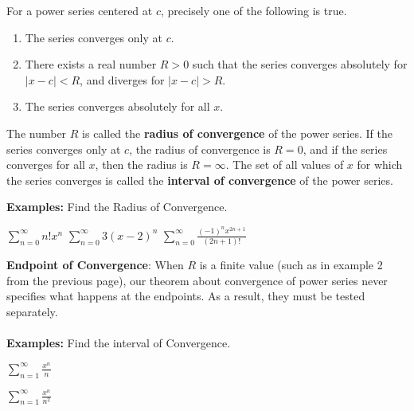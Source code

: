 \documentclass[addpoints, 12pt]{exam}
\begin{document}
\begin{tcolorbox}[title= CONVERGENCE OF A POWER SERIES,colframe=black,sharp corners,colback=white,colbacktitle=white,coltitle=black]

    For a power series centered at $c$, precisely one of the following is true.
    
    \begin{enumerate}
        \item The series converges only at $c$.
        \item There exists a real number $R>0$ such that the series converges absolutely for $|x-c|<R$, and diverges for $|x-c|>R$.
        \item The series converges absolutely for all $x$.
    \end{enumerate}
    The number $R$ is called the \textbf{radius of convergence} of the power series. If the series converges only at $c$, the radius of convergence is $R=0$, and if the series converges for all $x$, then the radius is $R=\infty$. The set of all values of $x$ for which the series converges is called the \textbf{interval of convergence} of the power series.

\end{tcolorbox}
\vspace{.1in}


\noindent\textbf{Examples:} Find the Radius of Convergence.
\begin{questions}
    \question $\displaystyle\sum_{n=0}^{\infty}n!x^n$
    \question $\displaystyle\sum_{n=0}^{\infty}3(x-2)^n$
    \question$\displaystyle\sum_{n=0}^{\infty}\frac{(-1)^n x^{2n+1}}{(2n+1)!}$
    

\end{questions}

\newpage


\noindent\textbf{Endpoint of Convergence}: When $R$ is a finite value (such as in example 2 from the previous page), our theorem about convergence of power series never specifies what happens at the endpoints. As a result, they must be tested separately.\\
\\
\noindent\textbf{Examples:} Find the interval of Convergence.
\begin{questions}
    \question $\displaystyle\sum_{n=1}^{\infty}\frac{x^n}{n}$
    
    \question$\displaystyle\sum_{n=1}^{\infty}\frac{x^n}{n^2}$
\end{questions}
\end{document}
